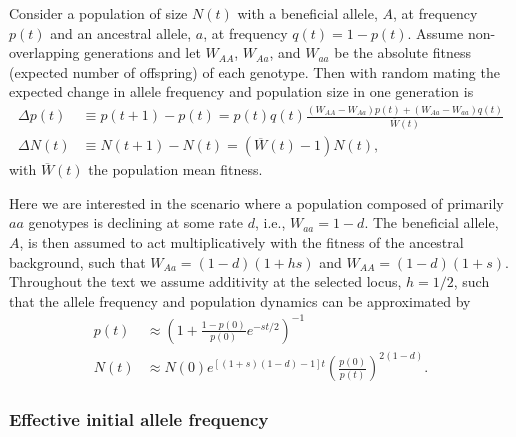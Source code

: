 \documentclass[]{article}
\begin{document}
Consider a population of size $N(t)$ with a beneficial allele, $A$, at frequency $p(t)$ and an ancestral allele, $a$, at frequency $q(t)=1-p(t)$.
Assume non-overlapping generations and let $W_{AA}$, $W_{Aa}$, and $W_{aa}$ be the absolute fitness (expected number of offspring) of each genotype.
Then with random mating the expected change in allele frequency \citep[equation 5.2.13 in][]{crow1970introduction} and population size in one generation is
\begin{equation}\label{eq:deltapdeltaN}
\begin{aligned}
\Delta p(t) &\equiv p(t+1) - p(t) = p(t) q(t) \frac{  (W_{AA} - W_{Aa} )p(t) +  (W_{Aa} - W_{aa})q(t)}{\overline{W}(t)}  \\
\Delta N(t) &\equiv N(t+1) - N(t) = (\overline{W}(t) - 1) N(t),
\end{aligned}
\end{equation}
with $\overline{W}(t)$ the population mean fitness.

Here we are interested in the scenario where a population composed of primarily $aa$ genotypes is declining at some rate $d$, i.e., $W_{aa} = 1-d$.
The beneficial allele, $A$, is then assumed to act multiplicatively with the fitness of the ancestral background, such that $W_{Aa} = (1-d)(1+ h s)$ and $W_{AA} = (1-d)(1+s)$.
Throughout the text we assume additivity at the selected locus, $h=1/2$, such that the allele frequency \citep[c.f., equation 5.3.12 in][]{crow1970introduction} and population dynamics can be approximated by
\begin{equation}\label{eq:ptnt}
\begin{aligned}
p(t) &\approx \left( 1 + \frac{1-p(0)}{p(0)} e^{-s t/2} \right)^{-1}\\
N(t) &\approx N(0) e^{ \left[ (1+s)(1-d)-1\right]t} \left(\frac{p(0)}{p(t)} \right)^{2(1-d)}.
\end{aligned}
\end{equation}

\subsubsection*{Effective initial allele frequency}
\label{sec:initial_frequency}
\end{document}
